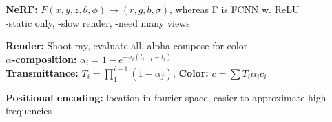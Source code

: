 \textbf{NeRF:} $F(x,y,z, \theta, \phi) \rightarrow (r,g,b,\sigma)$, whereas F is FCNN w. ReLU\\
-static only, -slow render, -need many views\\

\textbf{Render:} Shoot ray, evaluate all, alpha compose for color\\

\textbf{$\alpha$-composition:} $\alpha_i = 1- e^{-\sigma_i (t_{i+1} - t_i)}$\\
\textbf{Transmittance:} $T_i = \prod_1^{i-1} (1-\alpha_j)$, 
\textbf{Color:} $c = \sum T_i \alpha_i c_i$\\

\textbf{Positional encoding:} location in fourier space, easier to approximate high frequencies\\




